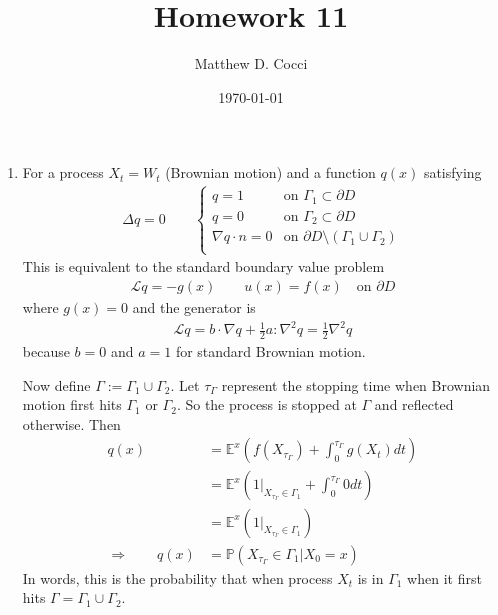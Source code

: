 \documentclass[12pt]{article}
\author{Matthew D. Cocci}
\title{Homework 11}
\date{\today}
\theoremstyle{plain}
\theoremstyle{definition}
\theoremstyle{remark}
\begin{document}
\maketitle



\begin{enumerate}
  \item %
    For a process $X_t=W_t$ (Brownian motion) and a function $q(x)$
    satisfying
    \begin{align*}
      \Delta q = 0
      \qquad
      \begin{cases}
        q = 1 & \text{on } \Gamma_1 \subset \partial D \\
        q = 0 & \text{on } \Gamma_2 \subset \partial D \\
        \nabla q \cdot n = 0 &
          \text{on } \partial D \setminus (\Gamma_1 \cup \Gamma_2) \\
      \end{cases}
    \end{align*}
    This is equivalent to the standard boundary value problem
    \begin{align*}
      \mathscr{L}q = -g(x) \qquad u(x) = f(x) \quad \text{on $\partial D$}
    \end{align*}
    where $g(x)=0$ and the generator is
    \begin{align*}
      \mathscr{L}q = b\cdot \nabla q +
      \frac{1}{2} a : \nabla^2 q = \frac{1}{2}\nabla^2 q
    \end{align*}
    because $b=0$ and $a=1$ for standard Brownian motion.

    Now define $\Gamma := \Gamma_1 \cup \Gamma_2$. Let $\tau_\Gamma$
    represent the stopping time when Brownian motion first hits
    $\Gamma_1$ or $\Gamma_2$. So the process is stopped at $\Gamma$ and
    reflected otherwise. Then
    \begin{align*}
      q(x)
      &= \mathbb{E}^x\left(
        f(X_{\tau_\Gamma}) + \int^{\tau_\Gamma}_0 g(X_t) dt
        \right) \\
      &= \mathbb{E}^x\left(
        1|_{X_{\tau_\Gamma}\in \Gamma_1} + \int^{\tau_\Gamma}_0 0 dt
        \right) \\
      &= \mathbb{E}^x\left( 1|_{X_{\tau_\Gamma}\in \Gamma_1}\right)\\
      \Rightarrow\qquad
      q(x)
      &= \mathbb{P}\left( {X_{\tau_\Gamma}\in \Gamma_1} | X_0 =x\right)
    \end{align*}
    In words, this is the probability that when process $X_t$ is in
    $\Gamma_1$ when it first hits $\Gamma = \Gamma_1 \cup \Gamma_2$.


\end{enumerate}
\end{document}
